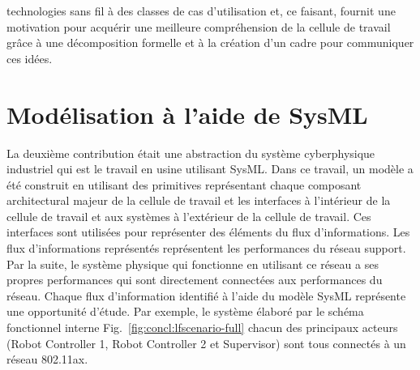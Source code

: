 \documentclass[12pt]{article}
\begin{document}
technologies sans fil à des classes de cas d'utilisation et, ce faisant, fournit une motivation pour acquérir une meilleure compréhension de la cellule de travail grâce à une décomposition formelle et à la création d'un cadre pour communiquer ces idées.

\section*{Modélisation à l'aide de SysML}
La deuxième contribution était une abstraction du système cyberphysique industriel qui est le travail en usine utilisant SysML. Dans ce travail, un modèle a été construit en utilisant des primitives représentant chaque composant architectural majeur de la cellule de travail et les interfaces à l'intérieur de la cellule de travail et aux systèmes à l'extérieur de la cellule de travail. Ces interfaces sont utilisées pour représenter des éléments du flux d'informations. Les flux d'informations représentés représentent les performances du réseau support. Par la suite, le système physique qui fonctionne en utilisant ce réseau a ses propres performances qui sont directement connectées aux performances du réseau. Chaque flux d'information identifié à l'aide du modèle SysML représente une opportunité d'étude. Par exemple, le système élaboré par le schéma fonctionnel interne Fig.~\ref{fig:concl:lfscenario-full} chacun des principaux acteurs (Robot Controller 1, Robot Controller 2 et Supervisor) sont tous connectés à un réseau 802.11ax.
\end{document}
